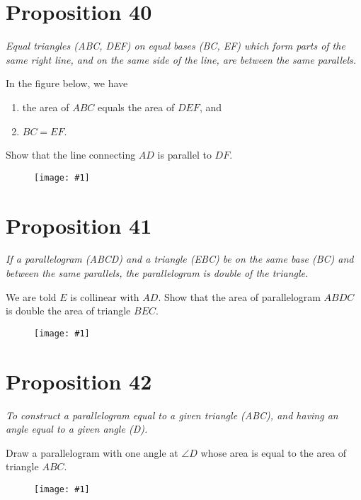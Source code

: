 \documentclass[openany]{book}
\newcommand{\diagram}[1]{
    \vspace*{\fill}
    \begin{figure}[H]
        \centering
        \texttt{[image: \#1]}
    \end{figure}
    \vspace*{\fill}
}
\newenvironment{proposition}
    {\begin{center}\em}
    {\end{center}}
\begin{document}
    \clearpage
    \section{Proposition 40}
    \begin{proposition}
    Equal triangles (ABC, DEF) on equal bases (BC, EF) which form parts of the same right line, and on the same side of
    the line, are between the same parallels.
    \end{proposition}
    In the figure below, we have
    \begin{enumerate}
        \item the area of $ABC$ equals the area of $DEF$, and
        \item $BC = EF$.
    \end{enumerate}
    Show that the line connecting $AD$ is parallel to $DF$.
    \diagram{prop40.pdf}


    \clearpage
    \section{Proposition 41}
    \begin{proposition}
    If a parallelogram (ABCD) and a triangle (EBC) be on the same base (BC) and between the same parallels, the
    parallelogram is double of the triangle.
    \end{proposition}
    We are told $E$ is collinear with $AD$. Show that the area of parallelogram $ABDC$ is double the area of triangle $BEC$.
    \diagram{prop41.pdf}


    \clearpage
    \section{Proposition 42}
    \begin{proposition}
    To construct a parallelogram equal to a given triangle (ABC), and having an angle equal to a given angle (D).
    \end{proposition}
    Draw a parallelogram with one angle at $\angle{D}$ whose area is equal to the area of triangle $ABC$.
    \diagram{prop42.pdf}


    \clearpage
\end{document}
